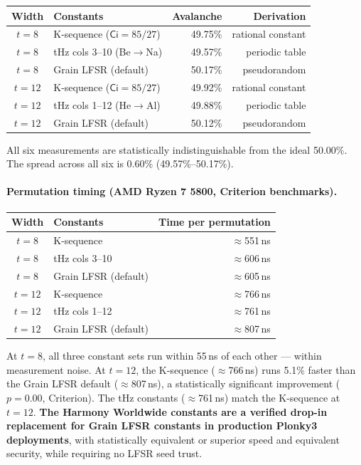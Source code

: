 \documentclass[preprint]{iacrtrans}
\newcommand{\Ci}{\ensuremath{\mathsf{Ci}}}
\begin{document}
\begin{center}
\begin{tabular}{clrr}
\toprule
Width & Constants & Avalanche & Derivation \\
\midrule
$t=8$  & K-sequence ($\Ci=85/27$) & 49.75\% & rational constant \\
$t=8$  & tHz cols 3--10 (Be$\to$Na) & 49.57\% & periodic table \\
$t=8$  & Grain LFSR (default) & 50.17\% & pseudorandom \\
\midrule
$t=12$ & K-sequence ($\Ci=85/27$) & 49.92\% & rational constant \\
$t=12$ & tHz cols 1--12 (He$\to$Al) & 49.88\% & periodic table \\
$t=12$ & Grain LFSR (default) & 50.12\% & pseudorandom \\
\bottomrule
\end{tabular}
\end{center}

All six measurements are statistically indistinguishable from the ideal
50.00\%. The spread across all six is 0.60\% (49.57\%--50.17\%).

\paragraph{Permutation timing (AMD Ryzen 7 5800, Criterion benchmarks).}

\begin{center}
\begin{tabular}{clr}
\toprule
Width & Constants & Time per permutation \\
\midrule
$t=8$  & K-sequence & $\approx$551\,ns \\
$t=8$  & tHz cols 3--10 & $\approx$606\,ns \\
$t=8$  & Grain LFSR (default) & $\approx$605\,ns \\
\midrule
$t=12$ & K-sequence & $\approx$766\,ns \\
$t=12$ & tHz cols 1--12 & $\approx$761\,ns \\
$t=12$ & Grain LFSR (default) & $\approx$807\,ns \\
\bottomrule
\end{tabular}
\end{center}

At $t=8$, all three constant sets run within 55\,ns of each other —
within measurement noise. At $t=12$, the K-sequence ($\approx$766\,ns)
runs 5.1\% faster than the Grain LFSR default ($\approx$807\,ns),
a statistically significant improvement ($p=0.00$, Criterion). The tHz
constants ($\approx$761\,ns) match the K-sequence at $t=12$.
\textbf{The Harmony Worldwide constants are a verified drop-in replacement
for Grain LFSR constants in production Plonky3 deployments}, with
statistically equivalent or superior speed and equivalent security,
while requiring no LFSR seed trust.
\end{document}
